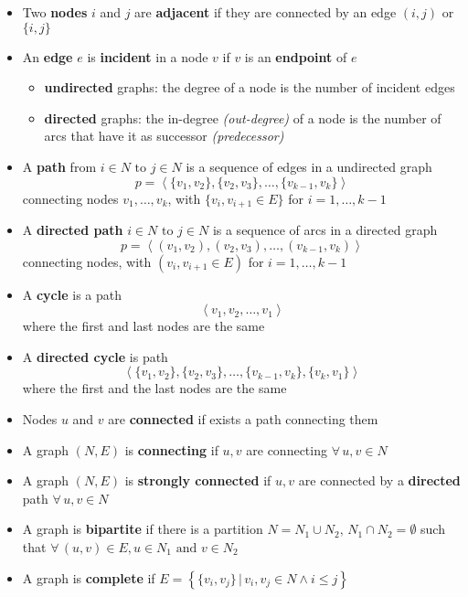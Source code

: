\documentclass[english]{article}
\begin{document}
\begin{itemize}
  \item Two \textbf{nodes} \(i\) and \(j\) are \textbf{adjacent} if they are connected by an edge \((i, j)\) or \(\{i, j\}\)
  \item An \textbf{edge} \(e\) is \textbf{incident} in a node \(v\) if \(v\) is an \textbf{endpoint} of \(e\)
        \begin{itemize}
          \item \textbf{undirected} graphs: the degree of a node is the number of incident edges
          \item \textbf{directed} graphs: the in-degree \textit{(out-degree)} of a node is the number of arcs that have it as successor \textit{(predecessor)}
        \end{itemize}
  \item A \textbf{path} from \(i \in N \text{ to } j \in N\) is a sequence of edges in a undirected graph
        \[ p = \left\langle \{v_1, v_2\}, \{v_2, v_3\}, \ldots, \{v_{k-1}, v_k\}\right\rangle \]
        connecting nodes \(v_1, \ldots, v_k\), with \(\{v_i, v_{i+1} \in E\}\) for \(i = 1, \ldots, k-1\)
  \item A \textbf{directed path} \(i \in N \text{ to } j \in N\) is a sequence of arcs in a directed graph
        \[ p = \left\langle (v_1, v_2), (v_2, v_3), \ldots, (v_{k-1}, v_k)\right\rangle \]
        connecting nodes, with  \((v_i, v_{i+1} \in E)\)  for \(i = 1, \ldots, k-1\)
  \item A \textbf{cycle} is a path \[ \left\langle v_1, v_2, \ldots, v_1 \right\rangle \] where the first and last nodes are the same
  \item A \textbf{directed cycle} is path \[ \left\langle \{v_1, v_2\}, \{v_2, v_3\}, \ldots, \{v_{k-1}, v_k\}, \{v_k, v_1\}\right\rangle \]
        where the first and the last nodes are the same
  \item Nodes \(u\) and \(v\) are \textbf{connected} if exists a path connecting them
  \item A graph \((N, E)\) is \textbf{connecting} if \(u, v\) are connecting \(\forall \, u, v \in N\)
  \item A graph \((N, E)\) is \textbf{strongly connected} if \(u, v\) are connected by a \textbf{directed} path \(\forall \, u, v \in N\)
  \item A graph is \textbf{bipartite} if there is a partition \(N = N_1 \cup N_2, \, N_1 \cap N_2 = \emptyset\) such that \(\forall \, (u, v) \in E, u \in N_1 \text{ and } v \in N_2\)
  \item A graph is \textbf{complete} if \(E = \left\{\{v_i, v_j\} \,|\, v_i, v_j \in N \land i \leq j \right\}\)

\end{itemize}
\end{document}
